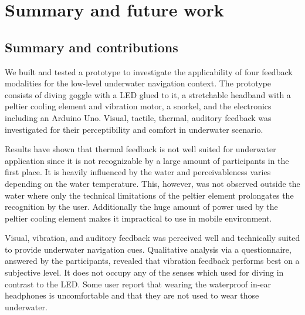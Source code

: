 %

\chapter{Summary and future work}
\label{summaryandfuturework}


\section{Summary and contributions}
\label{summaryandfuturework.summary}

We built and tested a prototype to investigate the applicability of four feedback modalities for the low-level underwater navigation context.
The prototype consists of diving goggle with a LED glued to it, a stretchable headband with a peltier cooling element and vibration motor, a snorkel, and the electronics including an Arduino Uno.
Visual, tactile, thermal, auditory feedback was investigated for their perceptibility and comfort in underwater scenario.

Results have shown that thermal feedback is not well suited for underwater application since it is not recognizable by a large amount of participants in the first place.
It is heavily influenced by the water and perceivableness varies depending on the water temperature.
This, however, was not observed outside the water where only the technical limitations of the peltier element prolongates the recognition by the user.
Additionally the huge amount of power used by the peltier cooling element makes it impractical to use in mobile environment.

Visual, vibration, and auditory feedback was perceived well and technically suited to provide underwater navigation cues.
Qualitative analysis via a questionnaire, answered by the participants, revealed that vibration feedback performs best on a subjective level.
It does not occupy any of the senses which used for diving in contrast to the LED.
Some user report that wearing the waterproof in-ear headphones is uncomfortable and that they are not used to wear those underwater.

